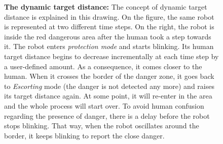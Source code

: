 \documentclass[oneside, a4paper, 12pt]{memoir}
\newcommand{\epuckblue}[3][0] %
{
	\draw [very thick, fill=RoyalBlue] (#2,#3) circle [radius=0.5];
	\draw [very thick, rotate around={#1:(#2,#3)}] (#2-0.25,#3-0.433) -- (#2,#3+0.45) -- (#2+0.25,#3-0.433);
}
\newcommand{\human}[3][0] %
{
	\draw [very thick, fill=white, rotate around={#1:(#2,#3)}] (#2-1,#3+0.5) ellipse (0.25cm and 0.5cm);
	\draw [very thick, fill=white, rotate around={#1:(#2,#3)}] (#2+1,#3+0.5) ellipse (0.25cm and 0.5cm);
	\draw [very thick, fill=white, rotate around={#1:(#2,#3)}] (#2,#3) ellipse (1.5cm and 0.75cm);
	\draw [thick, fill=white, rotate around={#1:(#2,#3)}] (#2-0.05,#3+1) -- (#2,#3+1.1) -- (#2+0.05,#3+1);
	\draw [very thick, fill=white, rotate around={#1:(#2,#3)}] (#2,#3+0.5) circle [radius=0.5cm];
}
\let\oldCaption\caption
\renewcommand{\caption}[2]{
\oldCaption[#1]{{\small\sffamily\bfseries #1:} #2}
}
\begin{document}
			\begin{figure}[!htp]\centering
				
				\caption{The dynamic target distance}{The concept of dynamic target distance is explained in this drawing. On the figure, the same robot is represented at two different time steps. On the right, the robot is inside the red dangerous area after the human took a step towards it. The robot enters \emph{protection mode} and starts blinking. Its human target distance begins to decrease incrementally at each time step by a user-defined amount. As a consequence, it comes closer to the human. When it crosses the border of the danger zone, it goes back to \emph{Escorting} mode (the danger is not detected any more) and raises its target distance again. At some point, it will re-enter in the area and the whole process will start over. To avoid human confusion regarding the presence of danger, there is a delay before the robot stops blinking. That way, when the robot oscillates around the border, it keeps blinking to report the close danger.}
				\label{fig:dynamic_target_distance}
			\end{figure}
			
\end{document}
